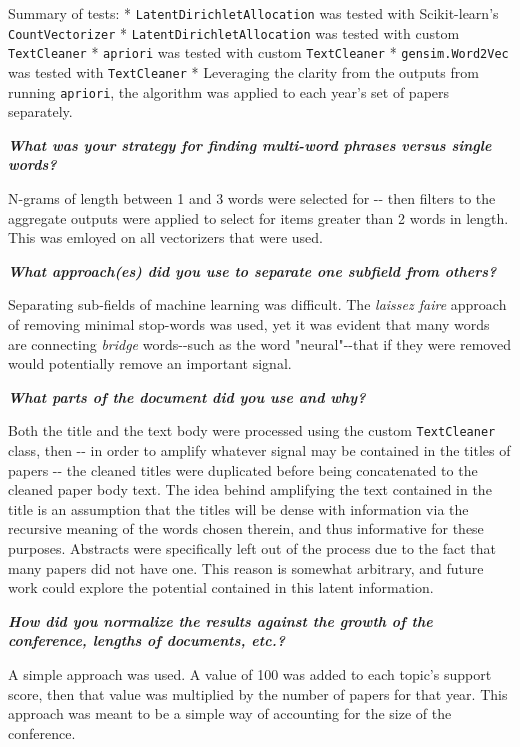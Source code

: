 \documentclass[11pt]{article}
\begin{document}
Summary of tests: * \texttt{LatentDirichletAllocation} was tested with
Scikit-learn's \texttt{CountVectorizer} *
\texttt{LatentDirichletAllocation} was tested with custom
\texttt{TextCleaner} * \texttt{apriori} was tested with custom
\texttt{TextCleaner} * \texttt{gensim.Word2Vec} was tested with
\texttt{TextCleaner} * Leveraging the clarity from the outputs from
running \texttt{apriori}, the algorithm was applied to each year's set
of papers separately.

\textbf{\emph{What was your strategy for finding multi-word phrases
versus single words?}}

N-grams of length between 1 and 3 words were selected for -\/- then
filters to the aggregate outputs were applied to select for items
greater than 2 words in length. This was emloyed on all vectorizers that
were used.

\textbf{\emph{What approach(es) did you use to separate one subfield
from others?}}

Separating sub-fields of machine learning was difficult. The
\emph{laissez faire} approach of removing minimal stop-words was used,
yet it was evident that many words are connecting \emph{bridge}
words-\/-such as the word "neural"-\/-that if they were removed would
potentially remove an important signal.

\textbf{\emph{What parts of the document did you use and why?}}

Both the title and the text body were processed using the custom
\texttt{TextCleaner} class, then -\/- in order to amplify whatever
signal may be contained in the titles of papers -\/- the cleaned titles
were duplicated before being concatenated to the cleaned paper body
text. The idea behind amplifying the text contained in the title is an
assumption that the titles will be dense with information via the
recursive meaning of the words chosen therein, and thus informative for
these purposes. Abstracts were specifically left out of the process due
to the fact that many papers did not have one. This reason is somewhat
arbitrary, and future work could explore the potential contained in this
latent information.

\textbf{\emph{How did you normalize the results against the growth of
the conference, lengths of documents, etc.?}}

A simple approach was used. A value of 100 was added to each topic's
support score, then that value was multiplied by the number of papers
for that year. This approach was meant to be a simple way of accounting
for the size of the conference.
\end{document}
